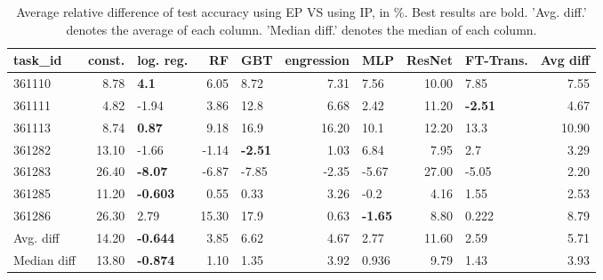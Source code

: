 \begin{table}[ht!]
\centering
\begingroup\footnotesize
\begin{tabular}{lrlrlrlrlr}
  \hline
\hline
task\_id & const. & log. reg. & RF & GBT & engression & MLP & ResNet & FT-Trans. & Avg diff \\ 
  \hline
361110 & 8.78 & \textbf{4.1} & 6.05 & 8.72 & 7.31 & 7.56 & 10.00 & 7.85 & 7.55 \\ 
  361111 & 4.82 & -1.94 & 3.86 & 12.8 & 6.68 & 2.42 & 11.20 & \textbf{-2.51} & 4.67 \\ 
  361113 & 8.74 & \textbf{0.87} & 9.18 & 16.9 & 16.20 & 10.1 & 12.20 & 13.3 & 10.90 \\ 
  361282 & 13.10 & -1.66 & -1.14 & \textbf{-2.51} & 1.03 & 6.84 & 7.95 & 2.7 & 3.29 \\ 
  361283 & 26.40 & \textbf{-8.07} & -6.87 & -7.85 & -2.35 & -5.67 & 27.00 & -5.05 & 2.20 \\ 
  361285 & 11.20 & \textbf{-0.603} & 0.55 & 0.33 & 3.26 & -0.2 & 4.16 & 1.55 & 2.53 \\ 
  361286 & 26.30 & 2.79 & 15.30 & 17.9 & 0.63 & \textbf{-1.65} & 8.80 & 0.222 & 8.79 \\ 
   \hline
Avg. diff & 14.20 & \textbf{-0.644} & 3.85 & 6.62 & 4.67 & 2.77 & 11.60 & 2.59 & 5.71 \\ 
  Median diff & 13.80 & \textbf{-0.874} & 1.10 & 1.35 & 3.92 & 0.936 & 9.79 & 1.43 & 3.93 \\ 
   \hline
\hline
\end{tabular}
\endgroup
\caption{Average relative difference of test accuracy using EP VS using IP, in \%. 
                  Best results are bold. 
                  'Avg. diff.' denotes the average of each column.
                  'Median diff.' denotes the median of each column.} 
\label{TABLES/table_results_accuracy_num_and_cat_features_EP_VS_IP}
\end{table}
